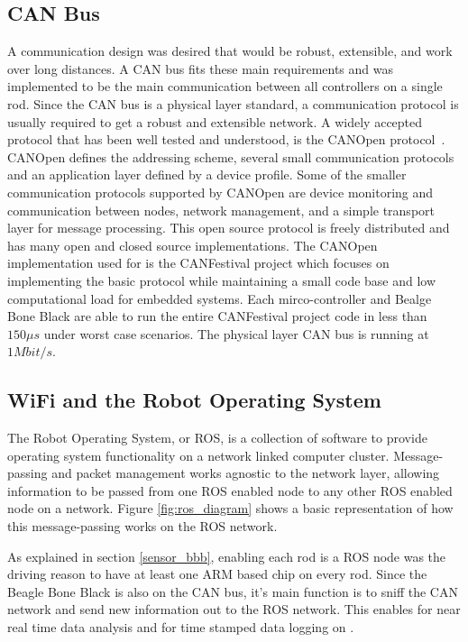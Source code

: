 \subsection{CAN Bus}
A communication design was desired that would be robust, extensible, and work over long distances.
A CAN bus fits these main requirements and was implemented to be the main communication between all controllers on a single rod.
Since the CAN bus is a physical layer standard, a communication protocol is usually required to get a robust and extensible network.
A widely accepted protocol that has been well tested and understood, is the CANOpen protocol~\cite{boterenbrood2000canopen}.
CANOpen defines the addressing scheme, several small communication protocols and an application layer defined by a device profile.
Some of the smaller communication protocols supported by CANOpen are device monitoring and communication between nodes, network management, and a simple transport layer for message processing.
This open source protocol is freely distributed and has many open and closed source implementations.
The CANOpen implementation used for \SB{} is the CANFestival project which focuses on implementing the basic protocol while maintaining a small code base and low computational load for embedded systems.
Each mirco-controller and Bealge Bone Black are able to run the entire CANFestival project code in less than \(150 \mu s\) under worst case scenarios.
The physical layer CAN bus is running at \(1 Mbit/s\).

\subsection{WiFi and the Robot Operating System}
The Robot Operating System, or ROS, is a collection of software to provide operating system functionality on a network linked computer cluster. 
Message-passing and packet management works agnostic to the network layer, allowing information to be passed from one ROS enabled node to any other ROS enabled node on a network.
Figure \ref{fig:ros_diagram} shows a basic representation of how this message-passing works on the \SB{} ROS network.

As explained in section \ref{sensor_bbb}, enabling each rod is a ROS node was the driving reason to have at least one ARM based chip on every rod.
Since the Beagle Bone Black is also on the CAN bus, it's main function is to sniff the CAN network and send new information out to the ROS network.
This enables for near real time data analysis and for time stamped data logging on \SB{}.

